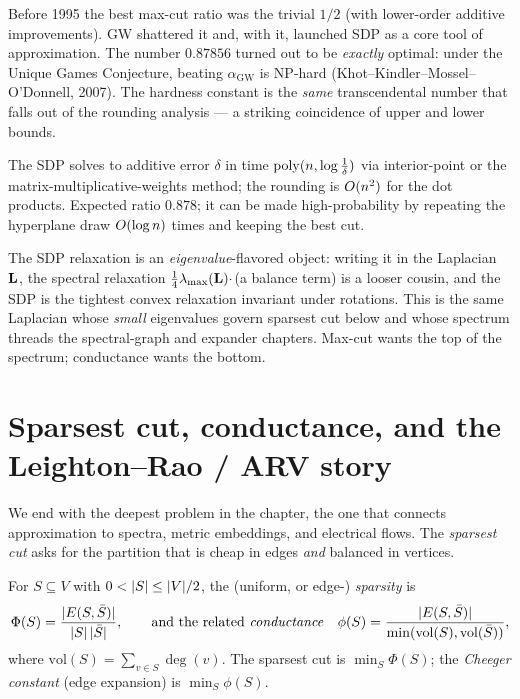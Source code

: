 \begin{historybox}
Before 1995 the best max-cut ratio was the trivial $1/2$ (with lower-order additive improvements). GW
shattered it and, with it, launched SDP as a core tool of approximation. The number $0.87856$ turned
out to be \emph{exactly} optimal: under the Unique Games Conjecture, beating
$\alpha_{\mathrm{GW}}$ is \textsf{NP}-hard (Khot--Kindler--Mossel--O'Donnell, 2007). The hardness
constant is the \emph{same} transcendental number that falls out of the rounding analysis --- a
striking coincidence of upper and lower bounds.
\end{historybox}

\begin{complexitybox}
The SDP solves to additive error $\delta$ in time $\operatorname{poly}(n,\log\tfrac1\delta)$ via interior-point or
the matrix-multiplicative-weights method; the rounding is $O(n^2)$ for the dot products. Expected
ratio $0.878$; it can be made high-probability by repeating the hyperplane draw $O(\log n)$ times
and keeping the best cut.
\end{complexitybox}

\begin{connectionbox}
The SDP relaxation is an \emph{eigenvalue}-flavored object: writing it in the Laplacian $\mathbf{L}$, the
spectral relaxation $\frac14\lambda_{\max}(\mathbf{L})\cdot$(a balance term) is a looser cousin, and the
SDP is the tightest convex relaxation invariant under rotations. This is the same Laplacian whose
\emph{small} eigenvalues govern sparsest cut below and whose spectrum threads the spectral-graph and
expander chapters. Max-cut wants the top of the spectrum; conductance wants the bottom.
\end{connectionbox}

\section{Sparsest cut, conductance, and the Leighton--Rao / ARV story}

We end with the deepest problem in the chapter, the one that connects approximation to spectra, metric
embeddings, and electrical flows. The \emph{sparsest cut} asks for the partition that is cheap in
edges \emph{and} balanced in vertices.

\begin{definition}\label{ch38:def-sparsest}
For $S\subseteq V$ with $0<\lvert S\rvert\le \lvert V\rvert/2$, the (uniform, or edge-) \emph{sparsity} is
\[
  \Phi(S) = \frac{\lvert E(S,\bar S)\rvert}{\lvert S\rvert\,\lvert\bar S\rvert},
  \qquad\text{and the related \emph{conductance}}\quad
  \phi(S) = \frac{\lvert E(S,\bar S)\rvert}{\min(\mathrm{vol}(S),\mathrm{vol}(\bar S))},
\]
where $\mathrm{vol}(S)=\sum_{v\in S}\deg(v)$. The sparsest cut is $\min_S\Phi(S)$; the
\emph{Cheeger constant} (edge expansion) is $\min_S \phi(S)$.
\end{definition}

